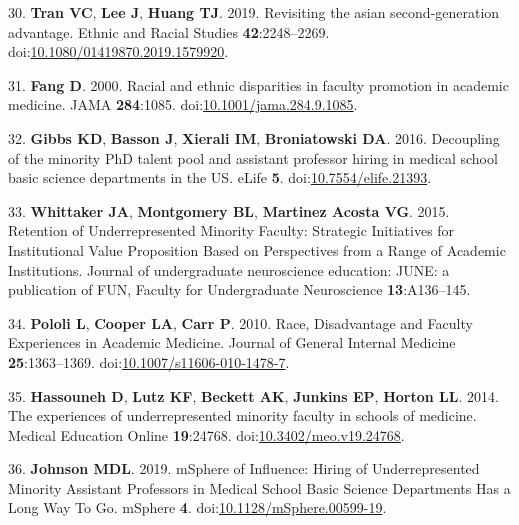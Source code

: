 \documentclass[10pt,]{article}
\begin{document}
\hypertarget{ref-Tran2019}{}
30. \textbf{Tran VC}, \textbf{Lee J}, \textbf{Huang TJ}. 2019.
Revisiting the asian second-generation advantage. Ethnic and Racial
Studies \textbf{42}:2248--2269.
doi:\href{https://doi.org/10.1080/01419870.2019.1579920}{10.1080/01419870.2019.1579920}.

\hypertarget{ref-Fang2000}{}
31. \textbf{Fang D}. 2000. Racial and ethnic disparities in faculty
promotion in academic medicine. JAMA \textbf{284}:1085.
doi:\href{https://doi.org/10.1001/jama.284.9.1085}{10.1001/jama.284.9.1085}.

\hypertarget{ref-Gibbs2016}{}
32. \textbf{Gibbs KD}, \textbf{Basson J}, \textbf{Xierali IM},
\textbf{Broniatowski DA}. 2016. Decoupling of the minority PhD talent
pool and assistant professor hiring in medical school basic science
departments in the US. eLife \textbf{5}.
doi:\href{https://doi.org/10.7554/elife.21393}{10.7554/elife.21393}.

\hypertarget{ref-whittaker_retention_2015}{}
33. \textbf{Whittaker JA}, \textbf{Montgomery BL}, \textbf{Martinez
Acosta VG}. 2015. Retention of Underrepresented Minority Faculty:
Strategic Initiatives for Institutional Value Proposition Based on
Perspectives from a Range of Academic Institutions. Journal of
undergraduate neuroscience education: JUNE: a publication of FUN,
Faculty for Undergraduate Neuroscience \textbf{13}:A136--145.

\hypertarget{ref-pololi_race_2010}{}
34. \textbf{Pololi L}, \textbf{Cooper LA}, \textbf{Carr P}. 2010. Race,
Disadvantage and Faculty Experiences in Academic Medicine. Journal of
General Internal Medicine \textbf{25}:1363--1369.
doi:\href{https://doi.org/10.1007/s11606-010-1478-7}{10.1007/s11606-010-1478-7}.

\hypertarget{ref-hassouneh_experiences_2014}{}
35. \textbf{Hassouneh D}, \textbf{Lutz KF}, \textbf{Beckett AK},
\textbf{Junkins EP}, \textbf{Horton LL}. 2014. The experiences of
underrepresented minority faculty in schools of medicine. Medical
Education Online \textbf{19}:24768.
doi:\href{https://doi.org/10.3402/meo.v19.24768}{10.3402/meo.v19.24768}.

\hypertarget{ref-johnson_msphere_2019}{}
36. \textbf{Johnson MDL}. 2019. mSphere of Influence: Hiring of
Underrepresented Minority Assistant Professors in Medical School Basic
Science Departments Has a Long Way To Go. mSphere \textbf{4}.
doi:\href{https://doi.org/10.1128/mSphere.00599-19}{10.1128/mSphere.00599-19}.
\end{document}
